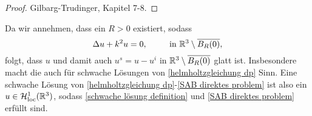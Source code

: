 \begin{proof}
	Gilbarg-Trudinger, Kapitel 7-8.
\end{proof}
Da wir annehmen, dass ein \(R>0\) existiert, sodass
\begin{equation*}
	\Delta u+k^2u=0,\;\qquad\text{ in }\mathbb{R}^3\setminus\overline{B_R(0)},
\end{equation*}
folgt, dass \(u\) und damit auch \(u^s=u-u^i\) in \(\mathbb{R}^3\setminus\overline{B_R(0)}\) glatt ist. Insbesondere macht die \SABdp auch für schwache Lösungen von \eqref{helmholtzgleichung dp} Sinn. Eine schwache Lösung von \eqref{helmholtzgleichung dp}-\eqref{SAB direktes problem} ist also ein \(u\in\mathcal{H}_{\mathrm{loc}}^1(\mathbb{R}^3)\), sodass \eqref{schwache lösung definition} und \eqref{SAB direktes problem} erfüllt sind.

























